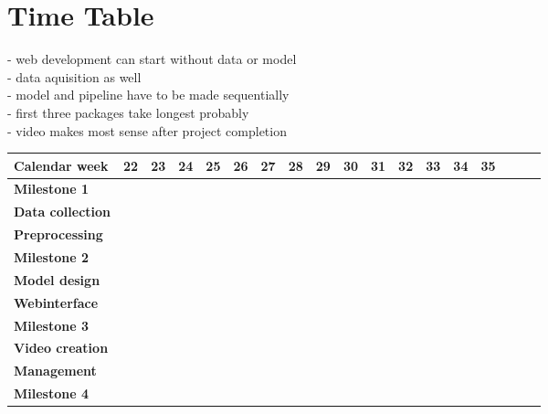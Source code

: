 \documentclass[lang=english,inputenc=utf8,fontsize=10pt]{ldvarticle}
\begin{document}
\section{Time Table}


- web development can start without data or model \\
- data aquisition as well \\
- model and pipeline have to be made sequentially \\
- first three packages take longest probably \\
- video makes most sense after project completion \\


\begin{center}
\begin{footnotesize}
\setlength{\arrayrulewidth}{1,05pt}
\begin{tabular}[htb]{|m{}|p{.3cm}|p{.3cm}|p{.3cm}|p{.3cm}|p{.3cm}|p{.3cm}|p{.3cm}|p{.3cm}|p{.3cm}|p{.3cm}|p{.3cm}|p{.3cm}|p{.3cm}|p{.3cm}|p{.3cm}|p{.3cm}|p{.3cm}|}
	\hline
	\textbf{Calendar week}&\tiny\textbf{22}&\tiny\textbf{23}&\tiny\textbf{24}&\tiny\textbf{25}& \tiny \textbf{26} & \tiny \textbf{27} & \tiny \textbf{28} & \tiny \textbf{29} &  \tiny \textbf{30} &  \tiny \textbf{31} &  \tiny \textbf{32} &  \tiny \textbf{33}  &  \tiny \textbf{34} &  \tiny \textbf{35} \\
	\hline
	\hline
	\rowcolor{lightgray} \textbf{Milestone 1}& \cellcolor{red} & & & & & & & & & & & & &\\
	\hline
	\rowcolor{lightgray} \textbf{Data collection}& \cellcolor{black} & \cellcolor{black} & \cellcolor{black} & \cellcolor{black} & & & & & & & & & & \\
	\hline
	\rowcolor{lightgray} \textbf{Preprocessing}& & & & \cellcolor{black} & \cellcolor{black} & \cellcolor{black} & \cellcolor{black} & & & & & & &\\
	\hline
	\rowcolor{lightgray} \textbf{Milestone 2}& & & & & \cellcolor{red} & & & & & & & & &\\
	\hline
	\rowcolor{lightgray} \textbf{Model design}& & & & & & & \cellcolor{black} & \cellcolor{black} & \cellcolor{black} & \cellcolor{black} & & & & \\
	\hline
	\rowcolor{lightgray} \textbf{Webinterface}& & & & & \cellcolor{black} & \cellcolor{black} & & & & & \cellcolor{black} & & &\\
	\hline
	\rowcolor{lightgray} \textbf{Milestone 3}& & & & & & & & & \cellcolor{red} & & & & &\\
	\hline
	\rowcolor{lightgray} \textbf{Video creation}& & & & & & & & & & & & \cellcolor{black} & \cellcolor{black} & \\
	\hline
	\rowcolor{lightgray} \textbf{Management}& \cellcolor{black} & \cellcolor{black} & \cellcolor{black} & \cellcolor{black} & \cellcolor{black} & \cellcolor{black} & \cellcolor{black} & \cellcolor{black} & \cellcolor{black} & \cellcolor{black} & \cellcolor{black} & \cellcolor{black} & \cellcolor{black} & \cellcolor{black} \\
	\hline
	\rowcolor{lightgray} \textbf{Milestone 4}& & & & & & & & & & & & & & \cellcolor{red}\\
	\hline


\end{tabular}
\end{footnotesize}
\end{center}
\end{document}
